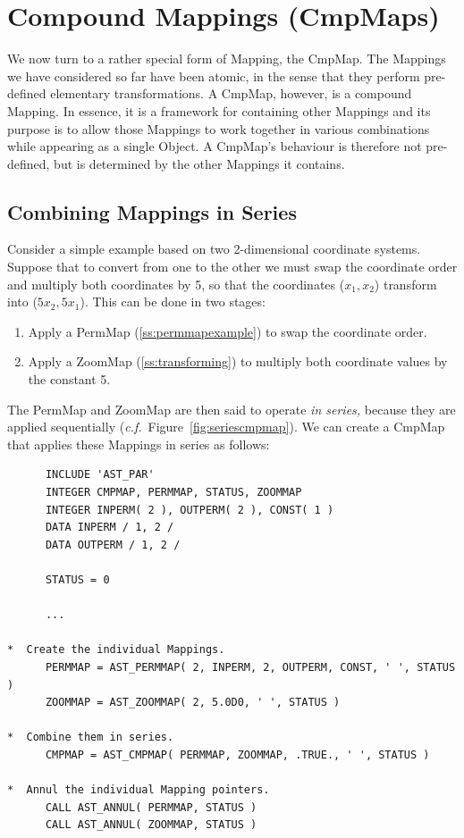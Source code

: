 \documentclass[twoside,11pt]{article}
\newcommand{\htmlref}[2]{#1}
\newcommand{\secref}[1]{\S\ref{#1}}
\renewcommand{\secref}[1]{\ref{#1}}
\begin{document}
\cleardoublepage
\section{\label{ss:cmpmaps}Compound Mappings (CmpMaps)}

We now turn to a rather special form of \htmlref{Mapping}{Mapping}, the \htmlref{CmpMap}{CmpMap}. The
Mappings we have considered so far have been atomic, in the sense that
they perform pre-defined elementary transformations. A CmpMap,
however, is a compound Mapping. In essence, it is a framework for
containing other Mappings and its purpose is to allow those Mappings
to work together in various combinations while appearing as a single
\htmlref{Object}{Object}. A CmpMap's behaviour is therefore not pre-defined, but is
determined by the other Mappings it contains.

\subsection{\label{ss:seriescmpmap}Combining Mappings in Series}

Consider a simple example based on two 2-dimensional coordinate
systems. Suppose that to convert from one to the other we must swap
the coordinate order and multiply both coordinates by 5, so that the
coordinates ($x_1,x_2$) transform into ($5x_2,5x_1$). This can be done
in two stages:

\begin{enumerate}
\item Apply a \htmlref{PermMap}{PermMap} (\secref{ss:permmapexample}) to swap the
coordinate order.

\item Apply a \htmlref{ZoomMap}{ZoomMap} (\secref{ss:transforming}) to multiply both
coordinate values by the constant 5.
\end{enumerate}

The PermMap and ZoomMap are then said to operate {\em{in series,}}
because they are applied sequentially
({\em{c.f.}}\ Figure~\ref{fig:seriescmpmap}).  We can create a \htmlref{CmpMap}{CmpMap}
that applies these Mappings in series as follows:

\small
\begin{verbatim}
      INCLUDE 'AST_PAR'
      INTEGER CMPMAP, PERMMAP, STATUS, ZOOMMAP
      INTEGER INPERM( 2 ), OUTPERM( 2 ), CONST( 1 )
      DATA INPERM / 1, 2 /
      DATA OUTPERM / 1, 2 /

      STATUS = 0

      ...

*  Create the individual Mappings.
      PERMMAP = AST_PERMMAP( 2, INPERM, 2, OUTPERM, CONST, ' ', STATUS )
      ZOOMMAP = AST_ZOOMMAP( 2, 5.0D0, ' ', STATUS )

*  Combine them in series.
      CMPMAP = AST_CMPMAP( PERMMAP, ZOOMMAP, .TRUE., ' ', STATUS )

*  Annul the individual Mapping pointers.
      CALL AST_ANNUL( PERMMAP, STATUS )
      CALL AST_ANNUL( ZOOMMAP, STATUS )
\end{verbatim}
\normalsize
\end{document}
